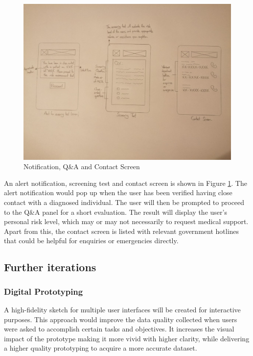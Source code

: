       \begin{figure}[H]
        \centering
        \includegraphics[width=\linewidth]{img/low-fidelity-prototype/sketch-3.png}
        \caption{Notification, Q\&A and Contact Screen}
        \label{fig:prototype-03}
      \end{figure}
      
      \par An alert notification, screening test and contact screen is shown in Figure \ref{fig:prototype-03}. The alert notification would pop up when the user has been verified having close contact with a diagnosed individual. The user will then be prompted to proceed to the Q\&A panel for a short evaluation. The result will display the user’s personal risk level, which may or may not necessarily to request medical support. Apart from this, the contact screen is listed with relevant government hotlines that could be helpful for enquiries or emergencies directly.

    \subsection{Further iterations}
      \subsubsection{Digital Prototyping}
        \par A high-fidelity sketch for multiple user interfaces will be created for interactive purposes. This approach would improve the data quality collected when users were asked to accomplish certain tasks and objectives. It increases the visual impact of the prototype making it more vivid with higher clarity, while delivering a higher quality prototyping to acquire a more accurate dataset.

